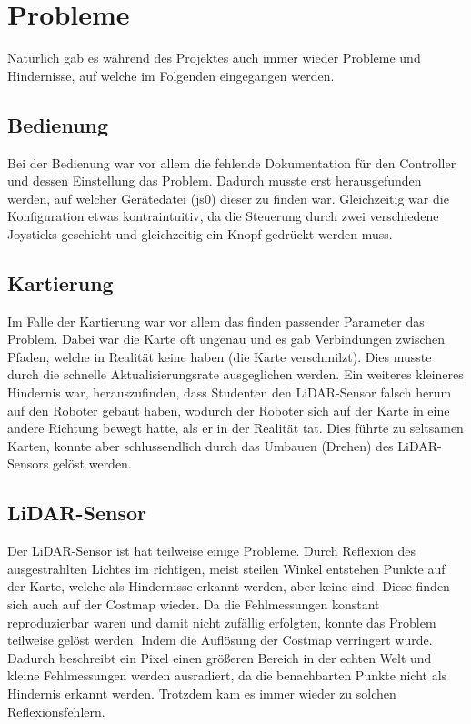 
\section{Probleme}
{
	Natürlich gab es während des Projektes auch immer wieder Probleme und Hindernisse, auf welche im Folgenden eingegangen werden.
	\subsection{Bedienung}
	{
		Bei der Bedienung war vor allem die fehlende Dokumentation für den Controller und dessen Einstellung das Problem. Dadurch musste erst herausgefunden werden, auf welcher Gerätedatei (js0) dieser zu finden war. Gleichzeitig war die Konfiguration etwas kontraintuitiv, da die Steuerung durch zwei verschiedene Joysticks geschieht und gleichzeitig ein Knopf gedrückt werden muss.
	}

	\subsection{Kartierung}
	{
		Im Falle der Kartierung war vor allem das finden passender Parameter das Problem. Dabei war die Karte oft ungenau und es gab Verbindungen zwischen Pfaden, welche in Realität keine haben (die Karte verschmilzt). Dies musste durch die schnelle Aktualisierungsrate ausgeglichen werden.
		Ein weiteres kleineres Hindernis war, herauszufinden, dass Studenten den LiDAR-Sensor falsch herum auf den Roboter gebaut haben, wodurch der Roboter sich auf der Karte in eine andere Richtung bewegt hatte, als er in der Realität tat. Dies führte zu seltsamen Karten, konnte aber schlussendlich durch das Umbauen (Drehen) des LiDAR-Sensors gelöst werden.
	}
	
	\subsection{LiDAR-Sensor}
	{
		Der LiDAR-Sensor ist hat teilweise einige Probleme. Durch Reflexion des ausgestrahlten Lichtes im richtigen, meist steilen Winkel entstehen Punkte auf der Karte, welche als Hindernisse erkannt werden, aber keine sind. Diese finden sich auch auf der Costmap wieder. Da die Fehlmessungen konstant reproduzierbar waren und damit nicht zufällig erfolgten, konnte das Problem teilweise gelöst werden. Indem die Auflösung der Costmap verringert wurde. Dadurch beschreibt ein  Pixel einen größeren Bereich in der echten Welt und kleine Fehlmessungen werden ausradiert, da die benachbarten Punkte nicht als Hindernis erkannt werden. Trotzdem kam es immer wieder zu solchen Reflexionsfehlern.
	}

}
\newpage

